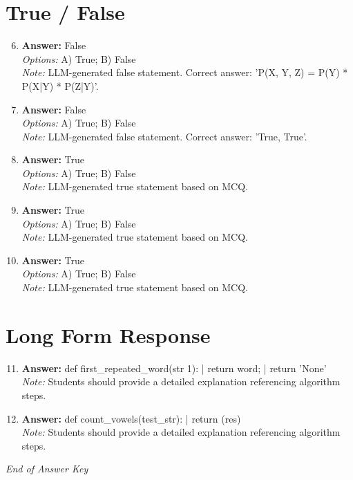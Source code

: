 \documentclass[12pt]{article}
\begin{document}
\section*{True / False}
\begin{enumerate}[label=\arabic*.]
\setcounter{enumi}{5}
\item \textbf{Answer:} False
\\ \textit{Options:} A) True; B) False
\\ \textit{Note:} LLM-generated false statement. Correct answer: 'P(X, Y, Z) = P(Y) * P(X|Y) * P(Z|Y)'.
\item \textbf{Answer:} False
\\ \textit{Options:} A) True; B) False
\\ \textit{Note:} LLM-generated false statement. Correct answer: 'True, True'.
\item \textbf{Answer:} True
\\ \textit{Options:} A) True; B) False
\\ \textit{Note:} LLM-generated true statement based on MCQ.
\item \textbf{Answer:} True
\\ \textit{Options:} A) True; B) False
\\ \textit{Note:} LLM-generated true statement based on MCQ.
\item \textbf{Answer:} True
\\ \textit{Options:} A) True; B) False
\\ \textit{Note:} LLM-generated true statement based on MCQ.
\end{enumerate}

\section*{Long Form Response}
\begin{enumerate}[label=\arabic*.]
\setcounter{enumi}{10}
\item \textbf{Answer:} def first\_repeated\_word(str 1): | return word; | return 'None'
\\ \textit{Note:} Students should provide a detailed explanation referencing algorithm steps.
\item \textbf{Answer:} def count\_vowels(test\_str): | return (res)
\\ \textit{Note:} Students should provide a detailed explanation referencing algorithm steps.
\end{enumerate}

\vfill
\noindent\textit{End of Answer Key}
\end{document}
